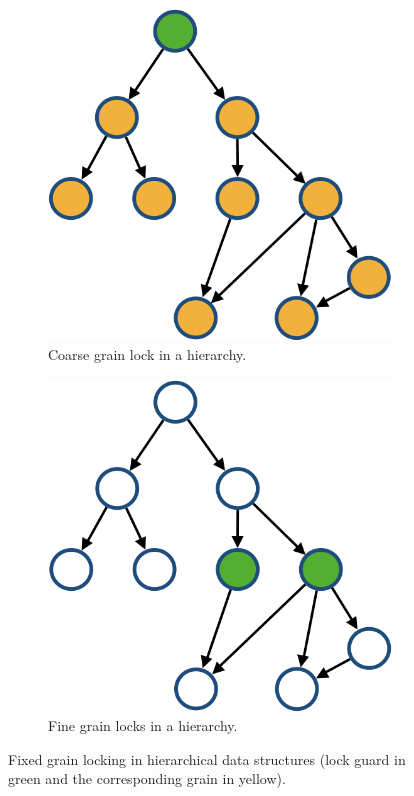 \begin{figure}[H]
    \captionsetup{justification=centering}
    \centering
    \begin{subfigure}{.49\textwidth}
        \centering
        \includegraphics[width=.7\columnwidth]{figures/CoarseGrainedLockingTree}
        \caption{Coarse grain lock in a hierarchy.}        
        \label{fig:fixedLockGrainsCoarse}
    \end{subfigure}
    \begin{subfigure}{.49\textwidth}
        \centering
        \includegraphics[width=.7\columnwidth]{figures/FineGrainLockingTree}
        \caption{Fine grain locks in a hierarchy.}
        \label{fig:fixedLockGrainsFine}
    \end{subfigure}
    
    \label{fig:fixedLockGrains}
\caption{Fixed grain locking in hierarchical data structures (lock guard in green and the corresponding grain in yellow).}
\end{figure}


